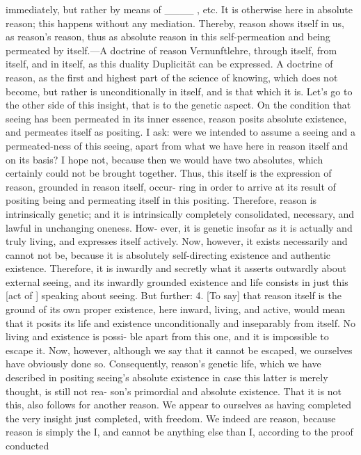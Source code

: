 immediately, but rather by means of ____ , etc. It is otherwise here in absolute
reason; this happens without any mediation. Thereby, reason shows itself in
us, as reason’s reason, thus as absolute reason in this self-permeation and being
permeated by itself.—A doctrine of reason {Vernunftlehre}, through itself, from
itself, and in itself, as this duality {Duplicität} can be expressed. A doctrine of
reason, as the first and highest part of the science of knowing, which does not
become, but rather is unconditionally in itself, and is that which it is.
Let’s go to the other side of this insight, that is to the genetic aspect. On
the condition that seeing has been permeated in its inner essence, reason
posits absolute existence, and permeates itself as positing. I ask: were we
intended to assume a seeing and a permeated-ness of this seeing, apart from
what we have here in reason itself and on its basis? I hope not, because then
we would have two absolutes, which certainly could not be brought together.
Thus, this itself is the expression of reason, grounded in reason itself, occur-
ring in order to arrive at its result of positing being and permeating itself in
this positing. Therefore, reason is intrinsically genetic; and it is intrinsically
completely consolidated, necessary, and lawful in unchanging oneness. How-
ever, it is genetic insofar as it is actually and truly living, and expresses itself
actively. Now, however, it exists necessarily and cannot not be, because it is
absolutely self-directing existence and authentic existence. Therefore, it is
inwardly and secretly what it asserts outwardly about external seeing, and its
inwardly grounded existence and life consists in just this [act of ] speaking
about seeing. But further:
4. [To say] that reason itself is the ground of its own proper existence,
here inward, living, and active, would mean that it posits its life and existence
unconditionally and inseparably from itself. No living and existence is possi-
ble apart from this one, and it is impossible to escape it. Now, however,
although we say that it cannot be escaped, we ourselves have obviously done
so. Consequently, reason’s genetic life, which we have described in positing
seeing’s absolute existence in case this latter is merely thought, is still not rea-
son’s primordial and absolute existence. That it is not this, also follows for
another reason. We appear to ourselves as having completed the very insight
just completed, with freedom. We indeed are reason, because reason is simply
the I, and cannot be anything else than I, according to the proof conducted
